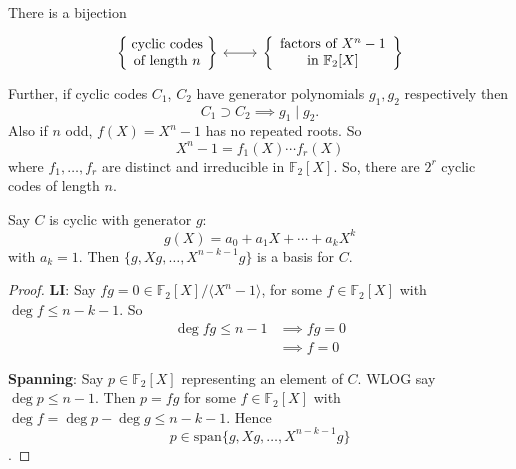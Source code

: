 \documentclass{article}
\newcommand{\F}{\mathbb{F}}
\newcommand{\1}[1]{\mathbbm{1}_{#1}}
\begin{document}
\begin{cor}
    There is a bijection
    \begin{equation*}
        \begin{tikzcd}
            \left\{\parbox{2cm}{\centering cyclic codes of length $n$}\right\} \ar[r, leftrightarrow] &
            \left\{\parbox{3cm}{\centering factors of $X^n - 1$ in $\F_2[X]$}\right\}
        \end{tikzcd}
    \end{equation*}
    Further, if cyclic codes $C_1$, $C_2$ have generator polynomials $g_1, g_2$ respectively then
    \begin{equation*}
        C_1 \supset C_2 \implies g_1 \mid g_2.
    \end{equation*}
    Also if $n$ odd, $f(X) = X^n - 1$ has no repeated roots. So
    \begin{equation*}
        X^n - 1 = f_1(X) \dotsm f_r(X)
    \end{equation*}
    where $f_1, \dotsc, f_r$ are distinct and irreducible in $\F_2[X]$.
    So, there are $2^r$ cyclic codes of length $n$.
\end{cor}
\begin{nlemma}
    Say $C$ is cyclic with generator $g$:
    \begin{equation*}
        g(X) = a_0 + a_1 X + \dotsb + a_k X^k
    \end{equation*}
    with $a_k = 1$. Then $\{g, Xg, \dotsc, X^{n-k-1} g\}$ is a basis for $C$.
\end{nlemma}
\begin{proof}
    \textbf{LI}: Say $fg = 0 \in \F_2[X]/\langle X^n - 1 \rangle$, for some $f \in \F_2[X]$ with $\deg f \leq n - k - 1$.
    So
    \begin{align*}
        \deg f g \leq n - 1 &\implies f g = 0 \\
                            &\implies f = 0
    \end{align*}

    \textbf{Spanning}: Say $p \in \F_2[X]$ representing an element of $C$. WLOG say $\deg p \leq n-1$.
    Then $p = f g$ for some $f \in \F_2[X]$ with $\deg f = \deg p - \deg g \leq n - k - 1$.
    Hence
    \begin{equation*}p \in \mathrm{span}\{g, Xg, \dotsc, X^{n-k-1} g\}\end{equation*}.
\end{proof}
\end{document}
